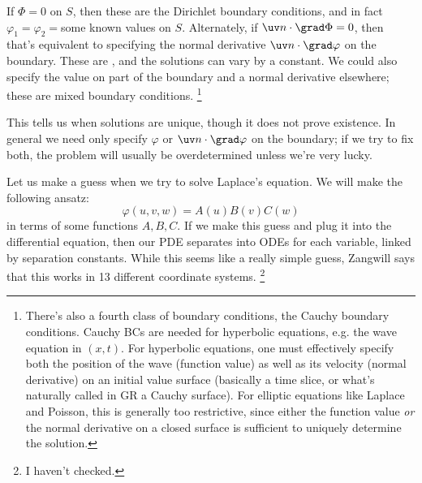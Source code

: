 If $\Phi=0$ on $S$, then these are the Dirichlet boundary conditions, and in fact $\varphi_1 = \varphi_2=$some known values on $S$. Alternately, if $\uv n \cdot \grad \Phi=0$, then that's equivalent to specifying the normal derivative $\uv n \cdot \grad \varphi$ on the boundary. These are , and the solutions can vary by a constant. We could also specify the value on part of the boundary and a normal derivative elsewhere; these are mixed boundary conditions.%
    \footnote{There's also a fourth class of boundary conditions, the Cauchy boundary conditions. Cauchy BCs are needed for hyperbolic equations, e.g. the wave equation in $(x,t)$. For hyperbolic equations, one must effectively specify both the position of the wave (function value) as well as its velocity (normal derivative) on an initial value surface (basically a time slice, or what's naturally called in GR a Cauchy surface). For elliptic equations like Laplace and Poisson, this is generally too restrictive, since either the function value \emph{or} the normal derivative on a closed surface is sufficient to uniquely determine the solution.}

This tells us when solutions are unique, though it does not prove existence. In general we need only specify $\varphi$ or $\uv n\cdot \grad \varphi$ on the boundary; if we try to fix both, the problem will usually be overdetermined unless we're very lucky.

Let us make a guess when we try to solve Laplace's equation. We will make the following ansatz:
\begin{equation}
    \varphi(u,v,w) = A(u) B(v) C(w)
\end{equation}
in terms of some functions $A,B,C$. If we make this guess and plug it into the differential equation, then our PDE separates into ODEs for each variable, linked by separation constants. While this seems like a really simple guess, Zangwill says that this works in 13 different coordinate systems.%
    \footnote{I haven't checked.}

